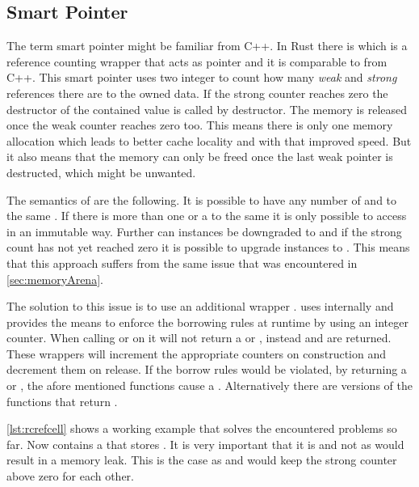 \documentclass[thesis]{subfiles}
\begin{document}
  \subsection{Smart Pointer}
    The term smart pointer might be familiar from C++.
    In Rust there is \RcT which is a reference counting wrapper that acts as pointer and it is comparable to  from C++.
    This smart pointer uses two integer to count how many \emph{weak} and \emph{strong} references there are to the owned data.
    If the strong counter reaches zero the destructor of the contained value is called by \RcTs destructor.
    The memory is released once the weak counter reaches zero too.
    This means there is only one memory allocation which leads to better cache locality and with that improved speed.
    But it also means that the memory can only be freed once the last weak pointer is destructed, which might be unwanted.
    \autocite[std::rc::Rc]{rust-doc}

    The semantics of \RcT are the following.
    It is possible to have any number of \RcTs and \WeakTs to the same \T.
    If there is more than one \RcT or a \WeakT to the same \T it is only possible to access \T in an immutable way.
    Further can \RcT instances be downgraded to \WeakT and if the strong count has not yet reached zero it is possible to upgrade \WeakT instances to \RcT.
    This means that this approach suffers from the same issue that was encountered in \autoref{sec:memoryArena}.\autocite[std::rc::Rc]{rust-doc}

    The solution to this issue is to use an additional wrapper \RcRefCellT.
    \RefCellT uses internally  and provides the means to enforce the borrowing rules at runtime by using an integer counter.
    When calling  or  on \RefCellT it will not return a  or , instead \RefT and \RefMutT are returned.
    These wrappers will increment the appropriate counters on construction and decrement them on release.
    If the borrow rules would be violated, by returning a \RefT or \RefMutT, the afore mentioned functions cause a \panic.
    Alternatively there are  versions of the functions that return .\autocite[std::cell::RefCell]{rust-doc}


    \autoref{lst:rcrefcell} shows a working example that solves the encountered problems so far.
    Now \Node contains a  that stores \WeakT.
    It is very important that it is \WeakT and not \RcT as \RcT would result in a memory leak.
    This is the case as  and  would keep the strong counter above zero for each other.
\end{document}
